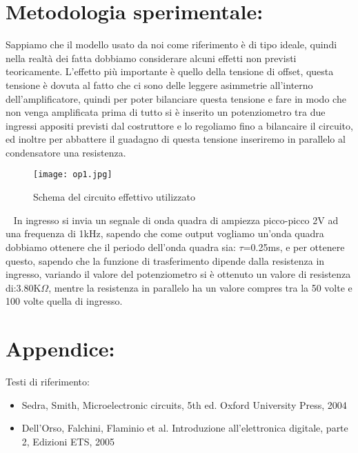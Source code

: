 \documentclass{article}
\begin{document}
\section{Metodologia sperimentale:}
Sappiamo che il modello usato da noi come riferimento è di tipo ideale, quindi nella realtà dei fatta dobbiamo considerare alcuni effetti non previsti teoricamente. L'effetto più importante è quello della tensione di offset, questa tensione è dovuta al fatto che ci sono delle leggere asimmetrie all'interno dell'amplificatore, quindi per poter bilanciare questa tensione e fare in modo che non venga amplificata prima di tutto si è inserito un potenziometro tra due ingressi appositi previsti dal costruttore e lo regoliamo fino a bilancaire il circuito, ed inoltre per abbattere il guadagno di questa tensione inseriremo in parallelo al condensatore una resistenza.
~
\begin{figure}[h!]
    \centering
    \texttt{[image: op1.jpg]} 
    \caption{Schema del circuito effettivo utilizzato}
    \label{figura1}
\end{figure}
~
In ingresso si invia un segnale di onda quadra di ampiezza picco-picco 2V ad una frequenza di 1kHz, sapendo che come output vogliamo un'onda quadra dobbiamo ottenere che il periodo dell'onda quadra sia: $\tau$=0.25ms, e per ottenere questo, sapendo che la funzione di trasferimento dipende dalla resistenza in ingresso, variando il valore del potenziometro si è ottenuto un valore di resistenza di:3.80K$\Omega$, mentre la resistenza in parallelo ha un valore compres tra la 50 volte e 100 volte quella di ingresso.
~
\section{Appendice:}
Testi di riferimento:
\begin{itemize}
    \item Sedra, Smith, Microelectronic circuits, 5th ed. Oxford University Press,
2004
    \item Dell’Orso, Falchini, Flaminio et al. Introduzione all’elettronica digitale,
parte 2, Edizioni ETS, 2005

\end{itemize}
\end{document}
